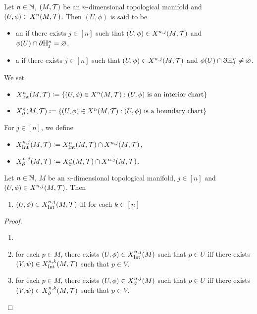 \documentclass{book}
\begin{document}
	\begin{defn} 
		Let $n \in \mathbb{N}$, $(M, \mathcal{T})$ be an $n$-dimensional topological manifold and $(U, \phi) \in X^{n}(M, \mathcal{T})$. Then $(U, \phi)$ is said to be 
		\begin{itemize}
			\item an  if there exists $j \in [n]$ such that $(U, \phi) \in X^{n, j}(M, \mathcal{T})$ and $\phi(U) \cap \partial \mathbb{H}^n_j = \varnothing$,
			\item a  if there exists $j \in [n]$ such that $(U, \phi) \in X^{n, j}(M, \mathcal{T})$ and $\phi(U) \cap \partial \mathbb{H}^n_j \neq \varnothing$.
		\end{itemize}
		We set 
		\begin{itemize}
			\item $X^n_{\operatorname{Int}}(M, \mathcal{T}) \vcentcolon= \{(U, \phi) \in X^n(M, \mathcal{T}): (U, \phi) \text{ is an interior chart}\}$
			\item $X^n_{\partial}(M, \mathcal{T}) \vcentcolon= \{(U, \phi) \in X^n(M, \mathcal{T}): (U, \phi) \text{ is a boundary chart}\}$
		\end{itemize} 
		For $j \in [n]$, we define 
		\begin{itemize}
			\item $X^{n,j}_{\operatorname{Int}}(M, \mathcal{T}) \vcentcolon= X^n_{\operatorname{Int}}(M, \mathcal{T}) \cap X^{n,j}(M, \mathcal{T})$,
			\item $X^{n,j}_{\partial}(M, \mathcal{T}) \vcentcolon= X^n_{\partial}(M, \mathcal{T}) \cap X^{n,j}(M, \mathcal{T})$.
		\end{itemize}
	\end{defn}

	\begin{ex}
		Let $n \in \mathbb{N}$, $M$ be an $n$-dimensional topological manifold, $j \in [n]$ and $(U, \phi) \in X^{n,j}(M, \mathcal{T})$. Then 
		\begin{enumerate}
			\item $(U, \phi) \in X^{n,j}_{\operatorname{Int}}(M, \mathcal{T})$ iff for each $k \in [n]$
		\end{enumerate} 
	\end{ex}
	
	\begin{proof}\
		\begin{enumerate}
			\item \item for each $p \in M$, there exists $(U, \phi) \in X^{n,j}_{\operatorname{Int}}(M)$ such that $p \in U$ iff there exists $(V, \psi) \in X^{n, k}_{\operatorname{Int}}(M, \mathcal{T})$ such that $p \in V$.
			\item for each $p \in M$, there exists $(U, \phi) \in X^{n,j}_{\partial}(M)$ such that $p \in U$ iff there exists $(V, \psi) \in X^{n, k}_{\partial}(M, \mathcal{T})$ such that $p \in V$.
		\end{enumerate}
	\end{proof}
\end{document}
